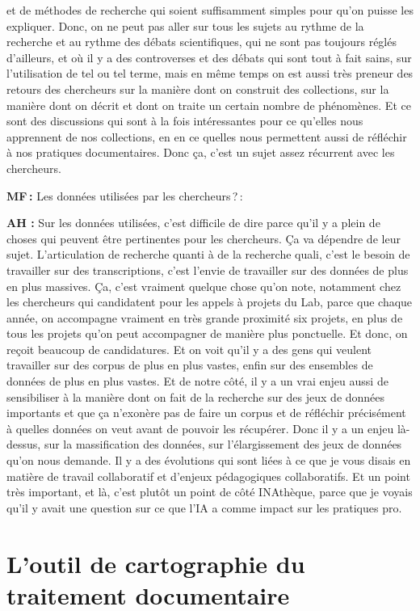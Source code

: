 et de méthodes de recherche qui soient suffisamment simples pour qu'on puisse les expliquer.  Donc, on ne peut pas aller sur tous les sujets au rythme de la recherche et au rythme des débats scientifiques, qui ne sont pas toujours réglés d'ailleurs, et où il y a des controverses et des débats qui sont tout à fait sains, sur l'utilisation de tel ou tel terme, mais en même temps on est aussi très preneur des retours des chercheurs sur la manière dont on construit des collections, sur la manière dont on décrit et dont on traite un certain nombre de phénomènes. Et ce sont des discussions qui sont à la fois intéressantes pour ce qu'elles nous apprennent de nos collections, en en ce quelles nous permettent aussi de réfléchir à nos pratiques documentaires.  Donc ça, c'est un sujet assez récurrent avec les chercheurs. 

\textbf{MF :} Les données utilisées par les chercheurs ? :  

\textbf{AH :} Sur les données utilisées, c'est difficile de dire parce qu'il y a plein de choses qui peuvent être pertinentes pour les chercheurs.  Ça va dépendre de leur sujet. L'articulation de recherche quanti à de la recherche quali, c'est le besoin de travailler sur des transcriptions, c'est l'envie de travailler sur des données de plus en plus massives. Ça, c'est vraiment quelque chose qu'on note, notamment chez les chercheurs qui candidatent pour les appels à projets du Lab, parce que chaque année, on accompagne vraiment en très grande proximité six projets, en plus de tous les projets qu'on peut accompagner de manière plus ponctuelle. Et donc, on reçoit beaucoup de candidatures. Et on voit qu'il y a des gens qui veulent travailler sur des corpus de plus en plus vastes, enfin sur des ensembles de données de plus en plus vastes. Et de notre côté, il y a un vrai enjeu aussi de sensibiliser à la manière dont on fait de la recherche sur des jeux de données importants et que ça n'exonère pas de faire un corpus et de réfléchir précisément à quelles données on veut avant de pouvoir les récupérer.  Donc il y a un enjeu là-dessus, sur la massification des données, sur l'élargissement des jeux de données qu'on nous demande.  Il y a des évolutions qui sont liées à ce que je vous disais en matière de travail collaboratif et d'enjeux pédagogiques collaboratifs. Et un point très important, et là, c'est plutôt un point de côté INAthèque, parce que je voyais qu'il y avait une question sur ce que l'IA a comme impact sur les pratiques pro. 

\section*{L’outil de cartographie du traitement documentaire } 

